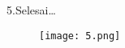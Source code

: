 \documentclass{wileySix}
\begin{document}
5.Selesai…
\begin{figure}[!htbp]
\centering
\texttt{[image: 5.png]}
\label{penanda}
\end{figure}



 


\printindex


\end{document}
